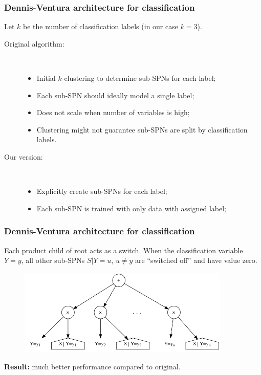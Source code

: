 \documentclass{beamer}
\begin{document}
\begin{frame}
  \frametitle{Dennis-Ventura architecture for classification}

  Let $k$ be the number of classification labels (in our case $k=3$).

  \begin{description}
    \item[Original algorithm:]~\\
      \begin{itemize}
        \item Initial $k$-clustering to determine sub-SPNs for each label;
        \item Each sub-SPN should ideally model a single label;
        \item Does not scale when number of variables is high;
        \item Clustering might not guarantee sub-SPNs are split by classification labels.
      \end{itemize}
    \item[Our version:]~\\
      \begin{itemize}
        \item Explicitly create sub-SPNs for each label;
        \item Each sub-SPN is trained with only data with assigned label;
      \end{itemize}
  \end{description}
\end{frame}

\begin{frame}
  \frametitle{Dennis-Ventura architecture for classification}

  Each product child of root acts as a switch. When the classification variable $Y=y$, all other
  sub-SPNs $S|Y=u$, $u\neq y$ are ``switched off'' and have value zero.

  \begin{figure}[h]
    \centering\includegraphics[width=0.9\textwidth]{imgs/classarch.png}
  \end{figure}

  \centering\textbf{Result:} much better performance compared to original.
\end{frame}
\end{document}
